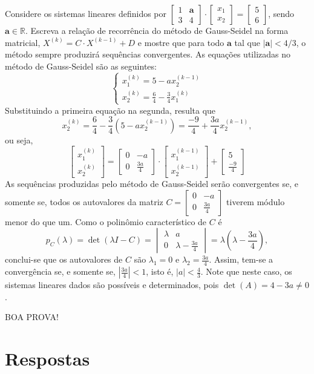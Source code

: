 \documentclass[12pt,a4paper]{article}
\newcommand*\R{\mathbb{R}}
\begin{document}
\begin{ExerciseList}
\Exercise[title={2,5}]
Considere os sistemas lineares definidos por
$
\begin{bmatrix}
1 & \mathbf{a}\\3 & 4
\end{bmatrix}
\cdot
\begin{bmatrix}
x_1 \\ x_2
\end{bmatrix}
=
\begin{bmatrix}
5 \\6
\end{bmatrix}$,
sendo $\mathbf{a} \in \R$. Escreva a relação de recorrência do método de Gauss-Seidel na forma matricial,
$X^{(k)} = C \cdot X^{(k-1)} +D$
e mostre que para todo $\mathbf{a}$ tal que $|\mathbf{a}| < 4/3$, o método sempre produzirá sequências convergentes.
\Answer
As equações utilizadas no método de Gauss-Seidel são as seguintes:
\[
\begin{cases}
x_1^{(k)} = 5 - a x_2^{(k-1)}\\
x_2^{(k)} = \frac{6}{4} - \frac{3}{4}x_1^{(k)}
\end{cases}
\]
Substituindo a primeira equação na segunda, resulta que \[
x_2^{(k)}
= \frac{6}{4} - \frac{3}{4}(5 - a x_2^{(k-1)})
= \frac{-9}{4} + \frac{3a}{4} x_2^{(k-1)},
\]
ou seja,
\[
\begin{bmatrix}
x_1^{(k)}\\
x_2^{(k)}
\end{bmatrix}
=
\begin{bmatrix}
0 & -a\\
0 & \frac{3a}{4}
\end{bmatrix}
\cdot
\begin{bmatrix}
x_1^{(k-1)}\\
x_2^{(k-1)}
\end{bmatrix}
+
\begin{bmatrix}
5\\
\frac{-9}{4}
\end{bmatrix}
\]
As sequências produzidas pelo método de Gauss-Seidel serão convergentes se, e somente se, todos os autovalores da matriz $C =
\begin{bmatrix}
0 & -a\\
0 & \frac{3a}{4}
\end{bmatrix}$ tiverem módulo menor do que um. Como o polinômio característico de $C$ é
\[
p_C(\lambda) = \det(\lambda I - C)
=
\begin{vmatrix}
\lambda & a\\
0 & \lambda-\frac{3a}{4}
\end{vmatrix}
= \lambda\left(\lambda-\frac{3a}{4}\right),
\]
conclui-se que os autovalores de $C$ são $\lambda_1 = 0$ e $\lambda_2 = \frac{3a}{4}$. Assim, tem-se a convergência se, e somente se, $\left|\frac{3a}{4}\right| < 1$, isto é, $|a| < \frac{4}{3}$. Note que neste caso, os sistemas lineares dados são possíveis e determinados, pois $\det(A) = 4-3a \neq 0$.
\end{ExerciseList}

\vfill
\begin{center}
BOA PROVA!
\end{center}

\newpage
\restoregeometry
\section*{Respostas}
\shipoutAnswer
\end{document}
